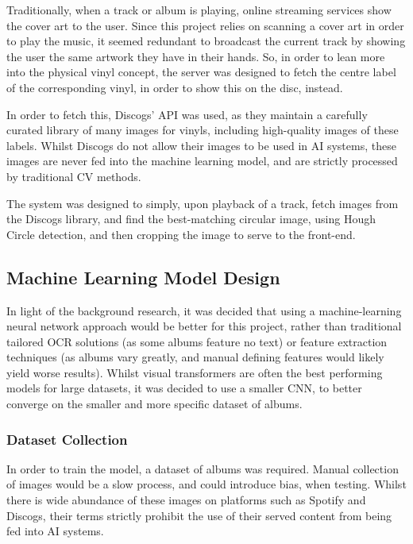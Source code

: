                 Traditionally, when a track or album is playing, online streaming services show the cover art to the user. Since this project relies on scanning a cover art in order to play the music, it seemed redundant to broadcast the current track by showing the user the same artwork they have in their hands. So, in order to lean more into the physical vinyl concept, the server was designed to fetch the centre label of the corresponding vinyl, in order to show this on the disc, instead.
    
                In order to fetch this, Discogs' API was used, as they maintain a carefully curated library of many images for vinyls, including high-quality images of these labels. Whilst Discogs do not allow their images to be used in AI systems, these images are never fed into the machine learning model, and are strictly processed by traditional CV methods.
    
                The system was designed to simply, upon playback of a track, fetch images from the Discogs library, and find the best-matching circular image, using Hough Circle detection, and then cropping the image to serve to the front-end.
          
        \subsection{Machine Learning Model Design} \label{sec:mlDesign}
    
            In light of the background research, it was decided that using a machine-learning neural network approach would be better for this project, rather than traditional tailored OCR solutions (as some albums feature no text) or feature extraction techniques (as albums vary greatly, and manual defining features would likely yield worse  results). Whilst visual transformers are often the best performing models for large datasets, it was decided to use a smaller CNN, to better converge on the smaller and more specific dataset of albums.
        
            \subsubsection{Dataset Collection}
    
                In order to train the model, a dataset of albums was required. Manual collection of images would be a slow process, and could introduce bias, when testing. Whilst there is wide abundance of these images on platforms such as Spotify and Discogs, their terms strictly prohibit the use of their served content from being fed into AI systems.
    
